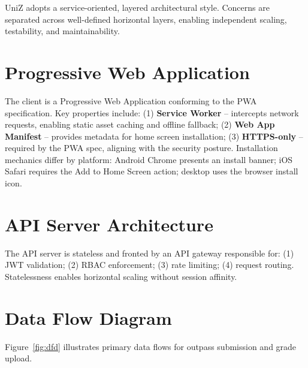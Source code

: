 \documentclass[12pt,a4paper]{report}
\begin{document}
UniZ adopts a service-oriented, layered architectural style. Concerns are separated across well-defined horizontal layers, enabling independent scaling, testability, and maintainability.

\section{Progressive Web Application}

The client is a Progressive Web Application conforming to the PWA specification. Key properties include: (1) \textbf{Service Worker} -- intercepts network requests, enabling static asset caching and offline fallback; (2) \textbf{Web App Manifest} -- provides metadata for home screen installation; (3) \textbf{HTTPS-only} -- required by the PWA spec, aligning with the security posture. Installation mechanics differ by platform: Android Chrome presents an install banner; iOS Safari requires the Add to Home Screen action; desktop uses the browser install icon.

\section{API Server Architecture}

The API server is stateless and fronted by an API gateway responsible for: (1) JWT validation; (2) RBAC enforcement; (3) rate limiting; (4) request routing. Statelessness enables horizontal scaling without session affinity.

\section{Data Flow Diagram}

Figure~\ref{fig:dfd} illustrates primary data flows for outpass submission and grade upload.
\end{document}
